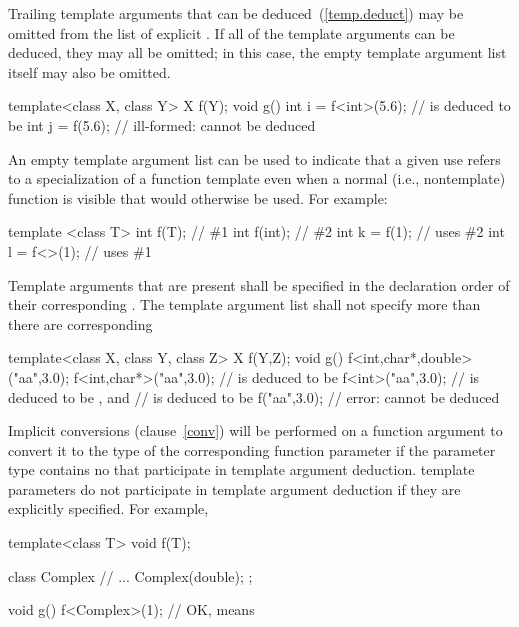 Trailing template arguments that can be deduced~(\ref{temp.deduct})
may be omitted from the list of explicit
.
If all of the template arguments can be deduced, they may all be omitted;
in this case, the empty template argument list
\tcode{<>}
itself may also be omitted.
\enterexample

\begin{codeblock}
template<class X, class Y> X f(Y);
void g()
{
	int i = f<int>(5.6);    //  is deduced to be 
	int j = f(5.6);         // ill-formed:  cannot be deduced
}
\end{codeblock}
\exitexampleb
\enternote
An empty template argument list can be used to indicate that a given
use refers to a specialization of a function template even when a
normal (i.e., nontemplate) function is visible that would otherwise be used.
For example:

\begin{codeblock}
template <class T> int f(T);    // \#1
int f(int);                     // \#2
int k = f(1);                   // uses \#2
int l = f<>(1);                 // uses \#1
\end{codeblock}
\exitnoteb

\pnum
Template arguments that are present shall be specified in the declaration
order of their corresponding
.
The template argument list shall not specify more
than there are corresponding
\enterexample

\begin{codeblock}
template<class X, class Y, class Z> X f(Y,Z);
void g()
{
	f<int,char*,double>("aa",3.0);
	f<int,char*>("aa",3.0);	//  is deduced to be 
	f<int>("aa",3.0);	//  is deduced to be , and
				//  is deduced to be 
	f("aa",3.0);            // error:  cannot be deduced
}
\end{codeblock}
\exitexampleb

\pnum
Implicit conversions (clause~\ref{conv}) will be performed on a function argument
to convert it to the type of the corresponding function parameter if
the parameter type contains no
that participate in template argument deduction.
\enternote
template parameters do not participate in template argument deduction if
they are explicitly specified.
For example,

\begin{codeblock}
template<class T> void f(T);

class Complex {
	// ...
	Complex(double);
};

void g()
{
	f<Complex>(1);		// OK, means 
}
\end{codeblock}
\exitnoteb

